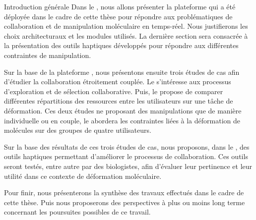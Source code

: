 \documentclass[myfrancais,ngerman,english,french]{mythesis}
\begin{document}
\begin{mychapter+}{Introduction générale}
		Dans le , nous allons présenter la plateforme \myShaddock qui a été déployée dans le cadre de cette thèse pour répondre aux problématiques de collaboration et de manipulation moléculaire en temps-réel.
		Nous justifierons les choix architecturaux et les modules utilisés.
		La dernière section sera consacrée à la présentation des outils haptiques développés pour répondre aux différentes contraintes de manipulation.

		Sur la base de la plateforme \myShaddock, nous présentons ensuite trois études de cas afin d'étudier la collaboration étroitement couplée.
		Le  s'intéresse aux processus d'exploration et de sélection collaborative.
		Puis, le  propose de comparer différentes répartitions des ressources entre les utilisateurs sur une tâche de déformation.
		Ces deux études ne proposant des manipulations que de manière individuelle ou en couple, le  abordera les contraintes liées à la déformation de molécules sur des groupes de quatre utilisateurs.

		Sur la base des résultats de ces trois études de cas, nous proposons, dans le , des outils haptiques permettant d'améliorer le processus de collaboration.
		Ces outils seront testés, entre autre par des biologistes, afin d'évaluer leur pertinence et leur utilité dans ce contexte de déformation moléculaire.

		Pour finir, nous présenterons la synthèse des travaux effectués dans le cadre de cette thèse.
		Puis nous proposerons des perspectives à plus ou moins long terme concernant les poursuites possibles de ce travail.
	\end{mychapter+}
\end{document}
